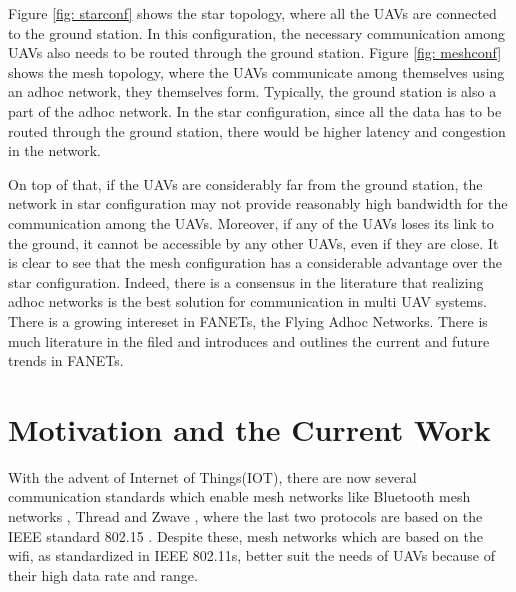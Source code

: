 Figure \ref{fig: starconf} shows the star topology, where all the UAVs are connected to the ground station. In this configuration, the necessary communication among UAVs also needs to be routed through the ground station. Figure \ref{fig: meshconf} shows the mesh topology, where the UAVs communicate among themselves using an adhoc network, they themselves form. Typically, the ground station is also a part of the adhoc network. In the star configuration, since all the data has to be routed through the ground station, there would be higher latency and congestion in the network.

On top of that, if the UAVs are considerably far from the ground station, the network in star configuration may not provide reasonably high bandwidth for the communication among the UAVs. Moreover, if any of the UAVs loses its link to the ground, it cannot be accessible by any other UAVs, even if they are close. It is clear to see that the mesh configuration has a considerable advantage over the star configuration. Indeed, there is a consensus in the literature that realizing adhoc networks is the best solution for communication in multi UAV systems. There is a growing intereset in FANETs, the Flying Adhoc Networks. There is much literature in the filed and \cite{fanets} introduces and outlines the current and future trends in FANETs.

\section{Motivation and the Current Work}
With the advent of Internet of Things(IOT), there are now several communication standards which enable mesh networks like Bluetooth mesh networks \cite{blemesh}, Thread \cite{thread, thread2} and Zwave \cite{zwave}, where the last two protocols are based on the IEEE standard 802.15 \cite{meshsurvey}. Despite these, mesh networks which are based on the wifi, as standardized in IEEE 802.11s, better suit the needs of UAVs because of their high data rate and range.

